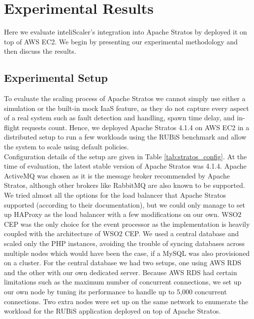 \section{Experimental Results}
Here we evaluate inteliScaler's integration into Apache Stratos by deployed it on top of AWS EC2. We begin by presenting our experimental methodology and then discuss the results.

\subsection{Experimental Setup}
To evaluate the scaling process of Apache Stratos we cannot simply use either a simulation or the built-in mock IaaS feature, as they do not capture every aspect of a real system such as fault detection and handling, spawn time delay, and in-flight requests count. Hence, we deployed Apache Stratos 4.1.4 on AWS EC2 in a distributed setup to run a few workloads using the RUBiS benchmark and allow the system to scale using default policies.\\

Configuration details of the setup are given in Table \ref{tab:stratos_config}. At the time of evaluation, the latest stable version of Apache Stratos was 4.1.4. Apache ActiveMQ was chosen as it is the message broker recommended by Apache Stratos, although other brokers like RabbitMQ are also known to be supported. We tried almost all the options for the load balancer that Apache Stratos supported (according to their documentation), but we could only manage to set up HAProxy as the load balancer with a few modifications on our own. WSO2 CEP was the only choice for the event processor as the implementation is heavily coupled with the architecture of WSO2 CEP. We used a central database and scaled only the PHP instances, avoiding the trouble of syncing databases across multiple nodes which would have been the case, if a MySQL was also provisioned on a cluster. For the central database we had two setups, one using AWS RDS and the other with our own dedicated server. Because AWS RDS had certain limitations such as the maximum number of concurrent connections, we set up our own node by tuning its performance to handle up to 5,000 concurrent connections. Two extra nodes were set up on the same network to enumerate the workload for the RUBiS application deployed on top of Apache Stratos.


